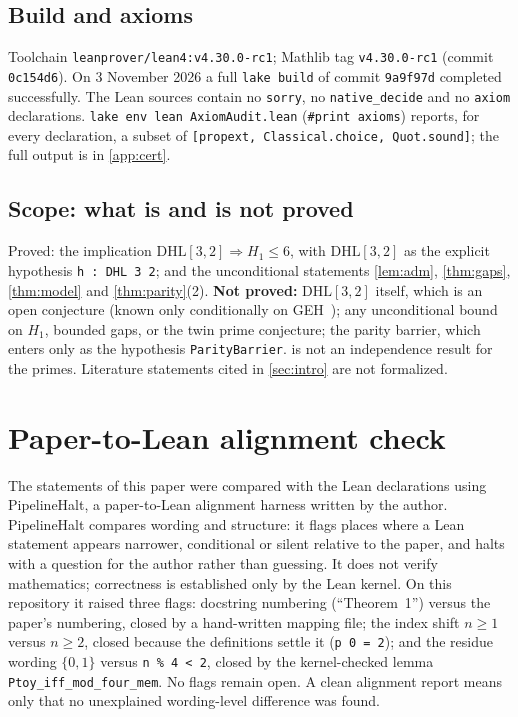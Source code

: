 \documentclass[11pt]{amsart}
\theoremstyle{plain}
\theoremstyle{definition}
\theoremstyle{remark}
\newcommand{\DHL}{\mathrm{DHL}}
\begin{document}
\subsection*{Build and axioms}
Toolchain \texttt{leanprover/lean4:v4.30.0-rc1}; Mathlib tag \texttt{v4.30.0-rc1} (commit \texttt{0c154d6}). On 3 November 2026 a full \texttt{lake build} of commit \texttt{9a9f97d} completed successfully. The Lean sources contain no \texttt{sorry}, no \texttt{native\_decide} and no \texttt{axiom} declarations. \texttt{lake env lean AxiomAudit.lean} (\texttt{\#print axioms}) reports, for every declaration, a subset of \texttt{[propext, Classical.choice, Quot.sound]}; the full output is in \cref{app:cert}.

\subsection*{Scope: what is and is not proved}
Proved: the implication $\DHL[3,2]\Rightarrow H_1\le6$, with $\DHL[3,2]$ as the explicit hypothesis \texttt{h : DHL 3 2}; and the unconditional statements \cref{lem:adm}, \cref{thm:gaps}, \cref{thm:model} and \cref{thm:parity}(2). \textbf{Not proved:} $\DHL[3,2]$ itself, which is an open conjecture (known only conditionally on GEH~\cite{Polymath}); any unconditional bound on $H_1$, bounded gaps, or the twin prime conjecture; the parity barrier, which enters only as the hypothesis \texttt{ParityBarrier}.  is not an independence result for the primes. Literature statements cited in \cref{sec:intro} are not formalized.

\section{Paper-to-Lean alignment check}\label{sec:align}
The statements of this paper were compared with the Lean declarations using PipelineHalt, a paper-to-Lean alignment harness written by the author. PipelineHalt compares wording and structure: it flags places where a Lean statement appears narrower, conditional or silent relative to the paper, and halts with a question for the author rather than guessing. It does not verify mathematics; correctness is established only by the Lean kernel. On this repository it raised three flags: docstring numbering (``Theorem~1'') versus the paper's numbering, closed by a hand-written mapping file; the index shift $n\ge1$ versus $n\ge2$, closed because the definitions settle it (\texttt{p 0 = 2}); and the residue wording $\{0,1\}$ versus \texttt{n \% 4 < 2}, closed by the kernel-checked lemma \texttt{Ptoy\_iff\_mod\_four\_mem}. No flags remain open. A clean alignment report means only that no unexplained wording-level difference was found.
\end{document}
